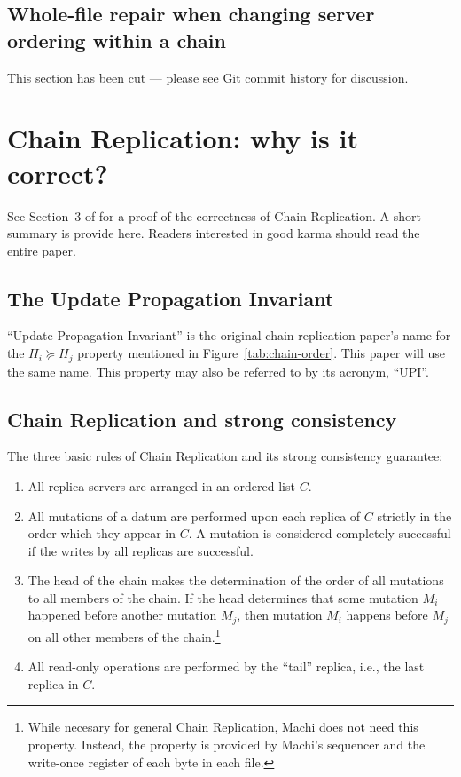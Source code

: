 \documentclass[preprint,10pt]{sigplanconf}
\begin{document}
\subsection{Whole-file repair when changing server ordering within a chain}
\label{sub:repair-chain-re-ordering}

This section has been cut --- please see Git commit history for discussion.

\section{Chain Replication: why is it correct?}
\label{sec:cr-proof}

See Section~3 of \cite{chain-replication} for a proof of the
correctness of Chain Replication.  A short summary is provide here.
Readers interested in good karma should read the entire paper.

\subsection{The Update Propagation Invariant}
\label{sub:upi}

``Update Propagation Invariant'' is the original chain replication
paper's name for the
$H_i \succeq H_j$
property mentioned in Figure~\ref{tab:chain-order}.
This paper will use the same name.
This property may also be referred to by its acronym, ``UPI''.

\subsection{Chain Replication and strong consistency}

The three basic rules of Chain Replication and its strong
consistency guarantee:

\begin{enumerate}

\item All replica servers are arranged in an ordered list $C$.

\item All mutations of a datum are performed upon each replica of $C$
  strictly in the order which they appear in $C$.  A mutation is considered
  completely successful if the writes by all replicas are successful.

\item The head of the chain makes the determination of the order of
  all mutations to all members of the chain.  If the head determines
  that some mutation $M_i$ happened before another mutation $M_j$,
  then mutation $M_i$ happens before $M_j$ on all other members of
  the chain.\footnote{While necesary for general Chain Replication,
    Machi does not need this property.  Instead, the property is
    provided by Machi's sequencer and the write-once register of each
    byte in each file.}

\item All read-only operations are performed by the ``tail'' replica,
  i.e., the last replica in $C$.

\end{enumerate}
\end{document}
